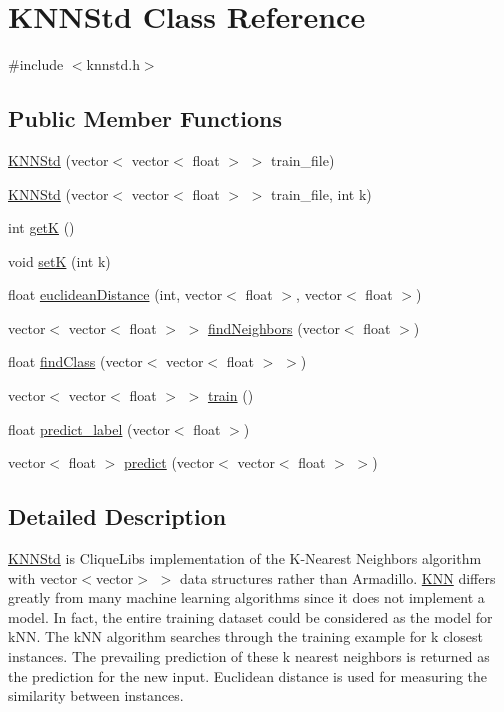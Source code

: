 \hypertarget{classKNNStd}{}\section{K\+N\+N\+Std Class Reference}
\label{classKNNStd}


{\ttfamily \#include $<$knnstd.\+h$>$}

\subsection*{Public Member Functions}
\begin{DoxyCompactItemize}
\item 
\hyperlink{classKNNStd_abfd0c263161568afdbf1a8bf96267230}{K\+N\+N\+Std} (vector$<$ vector$<$ float $>$ $>$ train\+\_\+file)
\item 
\hyperlink{classKNNStd_a706ed97e4625fdfe507a90bd152f1a15}{K\+N\+N\+Std} (vector$<$ vector$<$ float $>$ $>$ train\+\_\+file, int k)
\item 
int \hyperlink{classKNNStd_ad7ce711159c4c2609a4dd4a57d4bc98b}{getK} ()
\item 
void \hyperlink{classKNNStd_a4473354d0a585bf09896b1d6ada3d1e1}{setK} (int k)
\item 
float \hyperlink{classKNNStd_a620734fe288a7fff38d59f8c5f50c4f9}{euclidean\+Distance} (int, vector$<$ float $>$, vector$<$ float $>$)
\item 
vector$<$ vector$<$ float $>$ $>$ \hyperlink{classKNNStd_abb1d4ca9c2a997f799881c6e0b74f7de}{find\+Neighbors} (vector$<$ float $>$)
\item 
float \hyperlink{classKNNStd_a992822075592286e1ed4c43194e20be9}{find\+Class} (vector$<$ vector$<$ float $>$ $>$)
\item 
vector$<$ vector$<$ float $>$ $>$ \hyperlink{classKNNStd_a2de41ed4f9d4fd122839de95ad60e0a8}{train} ()
\item 
float \hyperlink{classKNNStd_a8a5545234ca9adcce0a6d38636f3f9b4}{predict\+\_\+label} (vector$<$ float $>$)
\item 
vector$<$ float $>$ \hyperlink{classKNNStd_a61d7d4d3d4be142927018cfa96a117c1}{predict} (vector$<$ vector$<$ float $>$ $>$)
\end{DoxyCompactItemize}


\subsection{Detailed Description}
\hyperlink{classKNNStd}{K\+N\+N\+Std} is Clique\+Lib\textquotesingle{}s implementation of the K-\/\+Nearest Neighbors algorithm with vector$<$vector$>$ $>$ data structures rather than Armadillo. \hyperlink{classKNN}{K\+NN} differs greatly from many machine learning algorithms since it does not implement a model. In fact, the entire training dataset could be considered as the model for k\+NN. The k\+NN algorithm searches through the training example for k closest instances. The prevailing prediction of these k nearest neighbors is returned as the prediction for the new input. Euclidean distance is used for measuring the similarity between instances. 

